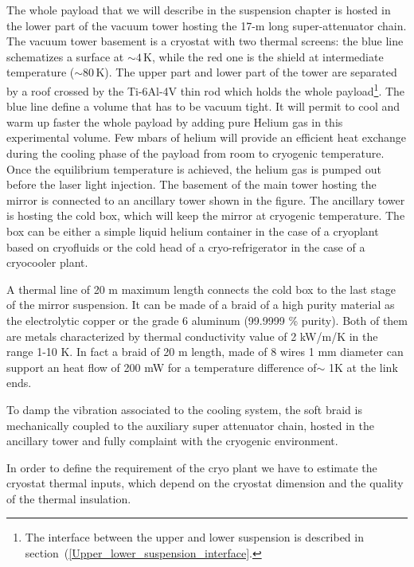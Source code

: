 The whole payload that we will describe in the suspension chapter is hosted in the lower part of the vacuum tower hosting the 17-m long super-attenuator chain.  The vacuum tower basement is a cryostat  with two thermal screens: the blue line schematizes a surface at $\sim4$\,K, while the red one is the shield at intermediate temperature ($\sim 80$\,K). The upper part and lower part of the tower are separated by a roof  crossed by the Ti-6Al-4V thin rod    which holds the whole payload\footnote{The interface between the upper and lower suspension is described in section~(\ref{Upper_lower_suspension_interface}.}.
The blue line define a volume that has to be vacuum tight. It will permit to cool and warm up faster  the whole payload by  adding pure Helium gas in this experimental volume. Few  mbars of helium   will provide an efficient heat exchange during the cooling phase of the payload from room to cryogenic temperature. Once  the equilibrium temperature is achieved, the helium gas is pumped out before  the laser light injection. 
The basement of the main tower hosting the mirror is connected to an ancillary tower  shown in the figure.
The ancillary tower is  hosting the cold box, which will keep the mirror at cryogenic temperature. The box can be either a simple liquid helium container in the case of a cryoplant based on cryofluids or the cold head of a cryo-refrigerator in the case of a cryocooler plant.

A  thermal line of 20 m maximum length connects the cold box to the last stage of the mirror suspension. It can be made of a  braid  of a high purity material as the electrolytic copper or the grade 6 aluminum (99.9999 \% purity). Both of them  are metals characterized by  thermal conductivity value of 2 kW/m/K in the range 1-10 K. In fact  a braid of   20 m length, made of 8 wires 1 mm diameter can support an heat flow of 200 mW for a temperature  difference  of$\sim$ 1K at the link ends.

To damp the vibration associated  to the cooling system, the soft braid is mechanically coupled to the auxiliary super attenuator chain, hosted in the ancillary tower and   fully complaint with the cryogenic environment. 


In order to define the requirement of  the cryo plant  we have to estimate the cryostat thermal inputs, which depend on the cryostat dimension and the quality of the thermal insulation. 

